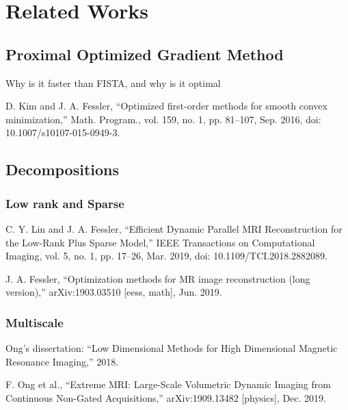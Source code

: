\chapter{Related Works}



\section{Proximal Optimized Gradient Method}
Why is it faster than FISTA, and why is it optimal

D. Kim and J. A. Fessler, “Optimized first-order methods for smooth convex minimization,” Math. Program., vol. 159, no. 1, pp. 81–107, Sep. 2016, doi: 10.1007/s10107-015-0949-3.

\section{Decompositions}

\subsection{Low rank and Sparse}
C. Y. Lin and J. A. Fessler, “Efficient Dynamic Parallel MRI Reconstruction for the Low-Rank Plus Sparse Model,” IEEE Transactions on Computational Imaging, vol. 5, no. 1, pp. 17–26, Mar. 2019, doi: 10.1109/TCI.2018.2882089.

J. A. Fessler, “Optimization methods for MR image reconstruction (long version),” arXiv:1903.03510 [eess, math], Jun. 2019.

\subsection{Multiscale}

Ong's dissertation: “Low Dimensional Methods for High Dimensional Magnetic Resonance Imaging,” 2018.

F. Ong et al., “Extreme MRI: Large-Scale Volumetric Dynamic Imaging from Continuous Non-Gated Acquisitions,” arXiv:1909.13482 [physics], Dec. 2019.

